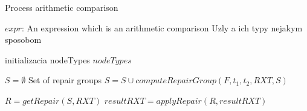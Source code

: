 \begin{algorithm}
\caption{Process arithmetic comparison}
\label{algorithm_process_arithmetic comparison}
\begin{algorithmic}[1]
\REQUIRE $expr$: An expression which is an arithmetic comparison
\ENSURE Uzly a ich typy nejakym sposobom

\STATE initializacia nodeTypes
\RETURN $nodeTypes$


    \STATE $S = \emptyset$ \COMMENT Set of repair groups
		    \STATE $S = S \cup computeRepairGroup(F, t_1, t_2, RXT, S)$
	    \ENDFOR
    \ENDFOR

    \STATE $R = getRepair(S, RXT)$
    \STATE $resultRXT = applyRepair(R, resultRXT)$
\ENDWHILE
\end{algorithmic}
\end{algorithm}